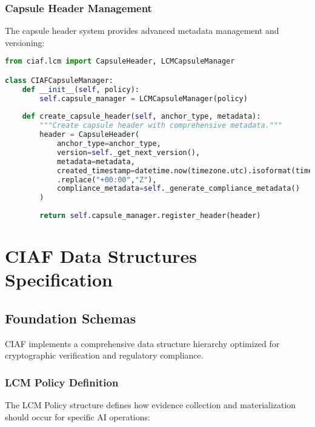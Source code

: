 \documentclass[12pt,a4paper]{article}
\begin{document}
\subsubsection{Capsule Header Management}

The capsule header system provides advanced metadata management and versioning:

\begin{lstlisting}[language=Python, caption=Capsule Header System]
from ciaf.lcm import CapsuleHeader, LCMCapsuleManager

class CIAFCapsuleManager:
    def __init__(self, policy):
        self.capsule_manager = LCMCapsuleManager(policy)
        
    def create_capsule_header(self, anchor_type, metadata):
        """Create capsule header with comprehensive metadata."""
        header = CapsuleHeader(
            anchor_type=anchor_type,
            version=self._get_next_version(),
            metadata=metadata,
            created_timestamp=datetime.now(timezone.utc).isoformat(timespec="microseconds")
            .replace("+00:00","Z"),
            compliance_metadata=self._generate_compliance_metadata()
        )
        
        return self.capsule_manager.register_header(header)
\end{lstlisting}

\section{CIAF Data Structures Specification}

\subsection{Foundation Schemas}

CIAF implements a comprehensive data structure hierarchy optimized for cryptographic verification and regulatory compliance.

\subsubsection{LCM Policy Definition}

The LCM Policy structure defines how evidence collection and materialization should occur for specific AI operations:
\end{document}
